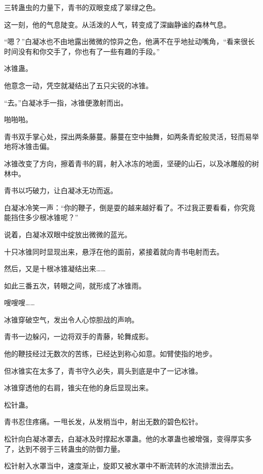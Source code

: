 
\begin{this_body}

三转蛊虫的力量下，青书的双眼变成了翠绿之色。

这一刻，他的气息陡变。从活泼的人气，转变成了深幽静谧的森林气息。

“嗯？”白凝冰也不由地露出微微的惊异之色，他满不在乎地扯动嘴角，“看来很长时间没有和你交手了，你也有了一些有趣的手段。”

冰锥蛊。

他意念一动，凭空就凝结出了五只尖锐的冰锥。

“去。”白凝冰手一指，冰锥便激射而出。

啪啪啪。

青书双手掌心处，探出两条藤蔓。藤蔓在空中抽舞，如两条青蛇般灵活，轻而易举地将冰锥击偏。

冰锥改变了方向，擦着青书的肩，射入冰冻的地面，坚硬的山石，以及冰雕般的树林中。

青书以巧破力，让白凝冰无功而返。

白凝冰冷笑一声：“你的鞭子，倒是耍的越来越好看了。不过我正要看看，你究竟能挡住多少根冰锥呢？”

说着，白凝冰双眼中绽放出微微的蓝光。

十只冰锥同时显现出来，悬浮在他的面前，紧接着就向青书电射而去。

然后，又是十根冰锥凝结出来……

如此三番五次，转眼之间，就形成了冰锥雨。

嗖嗖嗖……

冰锥穿破空气，发出令人心惊胆战的声响。

青书一边躲闪，一边将双手的青藤，轮舞成影。

他的鞭技经过无数次的苦练，已经达到称心如意。如臂使指的地步。

但冰锥实在太多了，青书守久必失，肩头到底是中了一记冰锥。

冰锥穿透他的右肩，锥尖在他的身后显现出来。

松针蛊。

青书忍住疼痛。一甩长发，从发梢当中，射出无数的碧色松针。

松针向白凝冰罩去，白凝冰及时撑起水罩蛊。他的水罩蛊也被增强，变得厚实多了，达到不弱于三转蛊虫的防御力量。

松针射入水罩当中，速度渐止，旋即又被水罩中不断流转的水流排泄出去。


\end{this_body}
